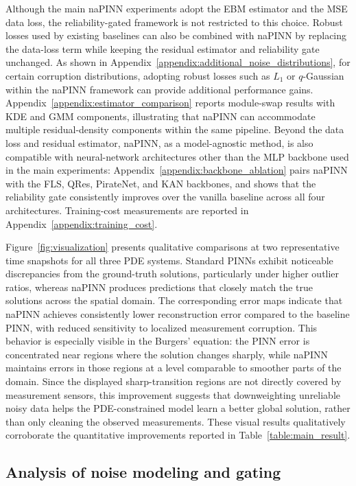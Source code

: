 \documentclass{article}
\theoremstyle{plain}
\theoremstyle{definition}
\theoremstyle{remark}
\begin{document}
Although the main naPINN experiments adopt the EBM estimator and the MSE data loss, the reliability-gated framework is not restricted to this choice. Robust losses used by existing baselines can also be combined with naPINN by replacing the data-loss term while keeping the residual estimator and reliability gate unchanged. As shown in Appendix~\ref{appendix:additional_noise_distributions}, for certain corruption distributions, adopting robust losses such as $L_1$ or $q$-Gaussian within the naPINN framework can provide additional performance gains. Appendix~\ref{appendix:estimator_comparison} reports module-swap results with KDE and GMM components, illustrating that naPINN can accommodate multiple residual-density components within the same pipeline. Beyond the data loss and residual estimator, naPINN, as a model-agnostic method, is also compatible with
neural-network architectures other than the MLP backbone used in the main
experiments: Appendix~\ref{appendix:backbone_ablation} pairs naPINN with the
FLS, QRes, PirateNet, and KAN backbones, and shows that the reliability
gate consistently improves over the vanilla baseline across all four
architectures. Training-cost measurements are reported in Appendix~\ref{appendix:training_cost}.

Figure~\ref{fig:visualization} presents qualitative comparisons at two representative time snapshots for all three PDE systems. Standard PINNs exhibit noticeable discrepancies from the ground-truth solutions, particularly under higher outlier ratios, whereas naPINN produces predictions that closely match the true solutions across the spatial domain. The corresponding error maps indicate that naPINN achieves consistently lower reconstruction error compared to the baseline PINN, with reduced sensitivity to localized measurement corruption. This behavior is especially visible in the Burgers' equation: the PINN error is concentrated near regions where the solution changes sharply, while naPINN maintains errors in those regions at a level comparable to smoother parts of the domain. Since the displayed sharp-transition regions are not directly covered by measurement sensors, this improvement suggests that downweighting unreliable noisy data helps the PDE-constrained model learn a better global solution, rather than only cleaning the observed measurements. These visual results qualitatively corroborate the quantitative improvements reported in Table~\ref{table:main_result}.

\subsection{Analysis of noise modeling and gating}
\end{document}
